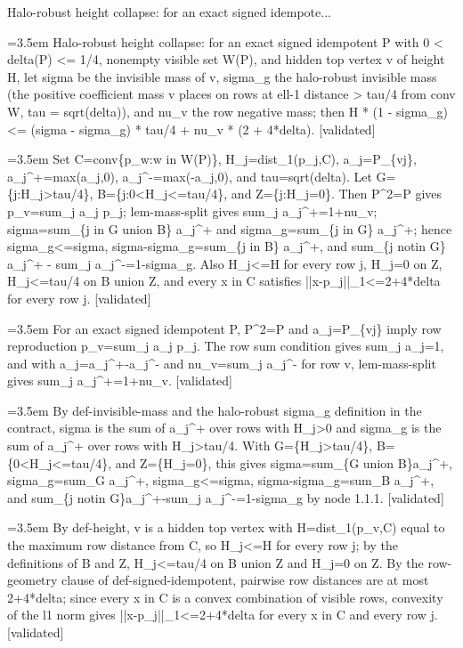 \documentclass{article}
\newcommand{\step}[1]{\par\noindent\hangindent=3.5em\hangafter=1%
  \makebox[3.5em][l]{\textbf{#1.}}}
\newcommand{\steptag}[1]{\hfill{\small\textsf{[#1]}}}
\begin{document}
\begin{proofbox}{Halo-robust height collapse: for an exact signed idempote...}
\step{1} Halo-robust height collapse: for an exact signed idempotent P with 0 < delta(P) <= 1/4, nonempty visible set W(P), and hidden top vertex v of height H, let sigma be the invisible mass of v, sigma\_g the halo-robust invisible mass (the positive coefficient mass v places on rows at ell-1 distance > tau/4 from conv W, tau = sqrt(delta)), and nu\_v the row negative mass; then H * (1 - sigma\_g) <= (sigma - sigma\_g) * tau/4 + nu\_v * (2 + 4*delta). \steptag{validated} \\[6pt]
\step{1.1} Set C=conv\{p\_w:w in W(P)\}, H\_j=dist\_1(p\_j,C), a\_j=P\_\{vj\}, a\_j\textasciicircum{}+=max(a\_j,0), a\_j\textasciicircum{}-=max(-a\_j,0), and tau=sqrt(delta). Let G=\{j:H\_j>tau/4\}, B=\{j:0<H\_j<=tau/4\}, and Z=\{j:H\_j=0\}. Then P\textasciicircum{}2=P gives p\_v=sum\_j a\_j p\_j; lem-mass-split gives sum\_j a\_j\textasciicircum{}+=1+nu\_v; sigma=sum\_\{j in G union B\} a\_j\textasciicircum{}+ and sigma\_g=sum\_\{j in G\} a\_j\textasciicircum{}+; hence sigma\_g<=sigma, sigma-sigma\_g=sum\_\{j in B\} a\_j\textasciicircum{}+, and sum\_\{j notin G\} a\_j\textasciicircum{}+ - sum\_j a\_j\textasciicircum{}-=1-sigma\_g. Also H\_j<=H for every row j, H\_j=0 on Z, H\_j<=tau/4 on B union Z, and every x in C satisfies ||x-p\_j||\_1<=2+4*delta for every row j. \steptag{validated} \\[6pt]
\step{1.1.1} For an exact signed idempotent P, P\textasciicircum{}2=P and a\_j=P\_\{vj\} imply row reproduction p\_v=sum\_j a\_j p\_j. The row sum condition gives sum\_j a\_j=1, and with a\_j=a\_j\textasciicircum{}+-a\_j\textasciicircum{}- and nu\_v=sum\_j a\_j\textasciicircum{}- for row v, lem-mass-split gives sum\_j a\_j\textasciicircum{}+=1+nu\_v. \steptag{validated} \\[4pt]
\step{1.1.2} By def-invisible-mass and the halo-robust sigma\_g definition in the contract, sigma is the sum of a\_j\textasciicircum{}+ over rows with H\_j>0 and sigma\_g is the sum of a\_j\textasciicircum{}+ over rows with H\_j>tau/4. With G=\{H\_j>tau/4\}, B=\{0<H\_j<=tau/4\}, and Z=\{H\_j=0\}, this gives sigma=sum\_\{G union B\}a\_j\textasciicircum{}+, sigma\_g=sum\_G a\_j\textasciicircum{}+, sigma\_g<=sigma, sigma-sigma\_g=sum\_B a\_j\textasciicircum{}+, and sum\_\{j notin G\}a\_j\textasciicircum{}+-sum\_j a\_j\textasciicircum{}-=1-sigma\_g by node 1.1.1. \steptag{validated} \\[4pt]
\step{1.1.3} By def-height, v is a hidden top vertex with H=dist\_1(p\_v,C) equal to the maximum row distance from C, so H\_j<=H for every row j; by the definitions of B and Z, H\_j<=tau/4 on B union Z and H\_j=0 on Z. By the row-geometry clause of def-signed-idempotent, pairwise row distances are at most 2+4*delta; since every x in C is a convex combination of visible rows, convexity of the l1 norm gives ||x-p\_j||\_1<=2+4*delta for every x in C and every row j. \steptag{validated} \\[4pt]

\end{proofbox}
\end{document}
